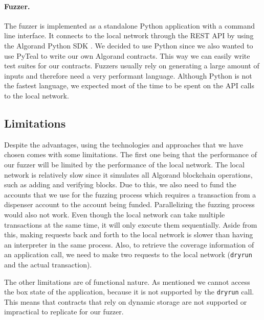 \paragraph*{Fuzzer.} The fuzzer is implemented as a standalone Python application with a command line interface.
It connects to the local network through the \acs{REST} \acs{API} by using the Algorand Python \acs{SDK} \cite{noauthor_algorand_nodate-5}.
We decided to use Python since we also wanted to use PyTeal to write our own Algorand contracts.
This way we can easily write test suites for our contracts.
Fuzzers usually rely on generating a large amount of inputs and therefore need a very performant language.
Although Python is not the fastest language, we expected most of the time to be spent on the \acs{API} calls to the local network.

\subsection*{Limitations}
Despite the advantages, using the technologies and approaches that we have chosen comes with some limitations.
The first one being that the performance of our fuzzer will be limited by the performance of the local network.
The local network is relatively slow since it simulates all Algorand blockchain operations, such as adding and verifying blocks.
Due to this, we also need to fund the accounts that we use for the fuzzing process which requires a transaction from a dispenser account to the account being funded.
Parallelizing the fuzzing process would also not work.
Even though the local network can take multiple transactions at the same time, it will only execute them sequentially.
Aside from this, making requests back and forth to the local network is slower than having an interpreter in the same process.
Also, to retrieve the coverage information of an application call, we need to make two requests to the local network (\texttt{dryrun} and the actual transaction).

The other limitations are of functional nature.
As mentioned we cannot access the box state of the application, because it is not supported by the \texttt{dryrun} call.
This means that contracts that rely on dynamic storage are not supported or impractical to replicate for our fuzzer.

